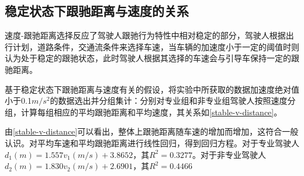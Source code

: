 

\subsection{稳定状态下跟驰距离与速度的关系}
速度-跟驰距离选择反应了驾驶人跟驰行为特性中相对稳定的部分，驾驶人根据出行计划，道路条件，交通流条件来选择车速，当车辆的加速度小于一定的阈值时则认为处于稳定的跟驰状态，此时驾驶人根据其选择的车速会与引导车保持一定的跟驰距离。

基于稳定状态下跟驰距离与速度有关的假设，将实验中所获取的数据加速度绝对值小于0.1$m/s^2$的数据选出并分组集计：分别对专业组和非专业组驾驶人按照速度分组，计算每组相应的平均跟驰距离和平均速度，其关系如\autoref{stable-v-distance}。

由\autoref{stable-v-distance}可以看出，整体上跟驰距离随车速的增加而增加，这符合一般认识。对平均车速和平均跟驰距离进行线性回归，得到回归方程。对于专业驾驶人$d_1(m)=1.557 v_1(m/s) + 3.8652$，其$R^2=0.3277$。对于非专业驾驶人$d_2(m)=1.830 v_2(m/s) + 2.6901$，其$R^2=0.4466$

